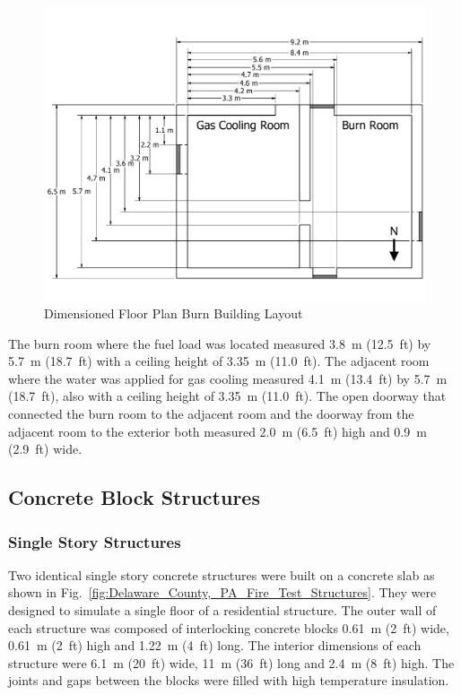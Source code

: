 \documentclass[12pt,oneside]{book}
\begin{document}
\begin{figure}[!ht]
	\includegraphics[width=\columnwidth]{../Figures/Floor_Plans/PDFs/West_Structure/DelCo_2012_West_Structure_Plain}
	\caption{Dimensioned Floor Plan Burn Building Layout}
	\label{fig:Delaware_County,_PA_Burn_Building_Layout}
\end{figure}

The burn room where the fuel load was located measured 3.8~m (12.5~ft) by 5.7~m (18.7~ft) with a ceiling height of 3.35~m (11.0~ft). The adjacent room where the water was applied for gas cooling measured 4.1~m (13.4~ft) by 5.7~m (18.7~ft), also with a ceiling height of 3.35~m (11.0~ft). The open doorway that connected the burn room to the adjacent room and the doorway from the adjacent room to the exterior both measured 2.0~m (6.5~ft) high and 0.9~m (2.9~ft) wide.

\subsection{Concrete Block Structures}
\label{sec:Experimental Structures}
\subsubsection*{Single Story Structures}

Two identical single story concrete structures were built on a concrete slab as shown in Fig.~\ref{fig:Delaware_County,_PA_Fire_Test_Structures}. They were designed to simulate a single floor of a residential structure.  The outer wall of each structure was composed of interlocking concrete blocks 0.61~m (2~ft) wide, 0.61~m (2~ft) high and 1.22~m (4~ft) long.  The interior dimensions of each structure were 6.1~m (20~ft) wide, 11~m (36~ft) long and 2.4~m (8~ft) high. The joints and gaps between the blocks were filled with high temperature insulation.
\end{document}
